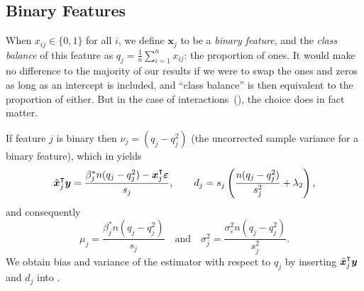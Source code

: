 \subsection{Binary Features}%
\label{sec:theory-binary-features}

When \(x_{ij} \in \{0, 1\}\) for all \(i\), we define \(\bm{x}_j\) to be a \emph{binary
  feature}, and the \emph{class balance} of this feature as \(q_j =
\frac{1}{n}\sum_{i=1}^n{x_{ij}}\): the proportion of ones. It would make no difference to
the majority of our results if we were to swap the ones and zeros as long as an intercept
is included, and ``class balance'' is then equivalent to the proportion of either. But in
the case of interactions~(), the choice does in fact matter.

If feature $j$ is binary then \(\nu_j = (q_j - q_j^2)\) (the uncorrected sample variance
for a binary feature), which in  yields
\begin{equation*}
  \tilde{\bm{x}}_j^\intercal \bm{y} = \frac{\beta_j^* n(q_j - q_j^2) - \bm{x}_j^\intercal \bm{\varepsilon}}{s_j}, \qquad
  d_j                          = s_j \left(\frac{n(q_j - q_j^2)}{s_j^2} + \lambda_2\right),
\end{equation*}
and consequently
\[
  \mu_j = \frac{\beta^*_j n(q_j - q_j^2)}{s_j}\quad \text{and} \quad \sigma_j^2 = \frac{\sigma_\varepsilon^2n(q_j- q_j^2)}{s^2_j}.
\]
%
We obtain bias and variance of the estimator with respect to \(q_j\) by inserting
\(\tilde{\bm{x}}_j^\intercal \bm{y}\) and \(d_j\) into .

